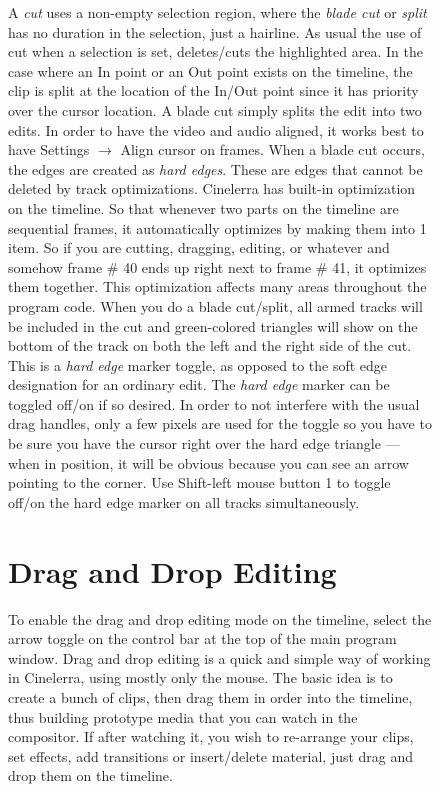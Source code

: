 \begin{figure}
 A \textit{cut} uses a non-empty selection region, where the \textit{blade cut} or \textit{split} has no duration in the selection, just a hairline.  As usual the use of cut when a selection is set, deletes/cuts the highlighted area.  In the case where an In point or an Out point exists on the timeline, the clip is split at the location of the In/Out point since it has priority over the cursor location.  A blade cut simply splits the edit into two edits.  In order to have the video and audio aligned, it works best to have Settings $\rightarrow$ Align cursor on frames.  When a blade cut occurs, the edges are created as \textit{hard edges}.  These are edges that cannot be deleted by track optimizations.
Cinelerra has built-in optimization on the timeline.  So that whenever two parts on the timeline are sequential frames, it automatically optimizes by making them into 1 item.  So if you are cutting, dragging, editing, or whatever and somehow frame \# 40 ends up right next to frame \# 41, it optimizes them together.  This optimization affects many areas throughout the program code.
When you do a blade cut/split, all armed tracks will be included in the cut and green-colored triangles will show on the bottom of the track on both the left and the right side of the cut.  This is a \textit{hard edge} marker toggle, as opposed to the soft edge designation for an ordinary edit.  The \textit{hard edge} marker can be toggled off/on if so desired.  In order to not interfere with the usual drag handles, only a few pixels are used for the toggle so you have to be sure you have the cursor right over the hard edge triangle  --- when in position, it will be obvious because you can see an arrow pointing to the corner.  Use Shift-left mouse button 1 to toggle off/on the hard edge marker on all tracks simultaneously.

\section{Drag and Drop Editing}%
\label{sec:drag_drop_editing}

To enable the drag and drop editing mode on the timeline, select the arrow toggle on the control bar at the top of the main program window.  Drag and drop editing is a quick and simple way of working in Cinelerra, using mostly only the mouse. The basic idea is to create a bunch of clips, then drag them in order into the timeline, thus building prototype media that you can watch in the compositor. If after watching it, you wish to re-arrange your clips, set effects, add transitions or insert/delete material, just drag and drop them on the timeline. 


\end{figure}
